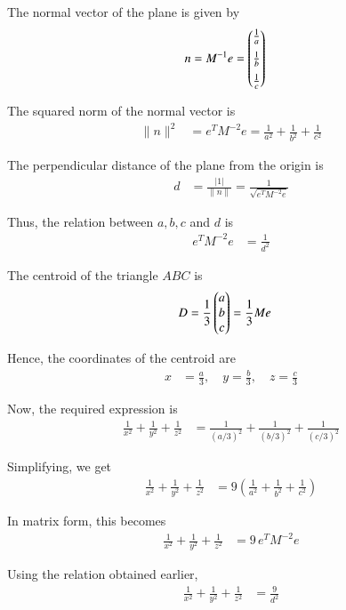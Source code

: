 \documentclass[journal]{IEEEtran}
\begin{document}
The normal vector of the plane is given by
\begin{align}
n &= M^{-1} e 
= \begin{pmatrix} \tfrac{1}{a} \\[6pt] \tfrac{1}{b} \\[6pt] \tfrac{1}{c} \end{pmatrix}
\end{align}

The squared norm of the normal vector is
\begin{align}
\|n\|^2 &= e^T M^{-2} e 
= \frac{1}{a^2} + \frac{1}{b^2} + \frac{1}{c^2}
\end{align}

The perpendicular distance of the plane from the origin is
\begin{align}
d &= \frac{|1|}{\|n\|} 
= \frac{1}{\sqrt{e^T M^{-2} e}}
\end{align}

Thus, the relation between $a,b,c$ and $d$ is
\begin{align}
e^T M^{-2} e &= \frac{1}{d^2}
\end{align}

The centroid of the triangle $ABC$ is
\begin{align}
D &= \frac{1}{3} \begin{pmatrix} a \\ b \\ c \end{pmatrix} 
= \frac{1}{3} M e
\end{align}

Hence, the coordinates of the centroid are
\begin{align}
x &= \tfrac{a}{3}, \quad y = \tfrac{b}{3}, \quad z = \tfrac{c}{3}
\end{align}

Now, the required expression is
\begin{align}
\frac{1}{x^2} + \frac{1}{y^2} + \frac{1}{z^2} 
&= \frac{1}{(a/3)^2} + \frac{1}{(b/3)^2} + \frac{1}{(c/3)^2}
\end{align}

Simplifying, we get
\begin{align}
\frac{1}{x^2} + \frac{1}{y^2} + \frac{1}{z^2}
&= 9\left(\frac{1}{a^2} + \frac{1}{b^2} + \frac{1}{c^2}\right)
\end{align}

In matrix form, this becomes
\begin{align}
\frac{1}{x^2} + \frac{1}{y^2} + \frac{1}{z^2}
&= 9\, e^T M^{-2} e
\end{align}

Using the relation obtained earlier,
\begin{align}
\frac{1}{x^2} + \frac{1}{y^2} + \frac{1}{z^2}
&= \frac{9}{d^2}
\end{align}
\end{document}
